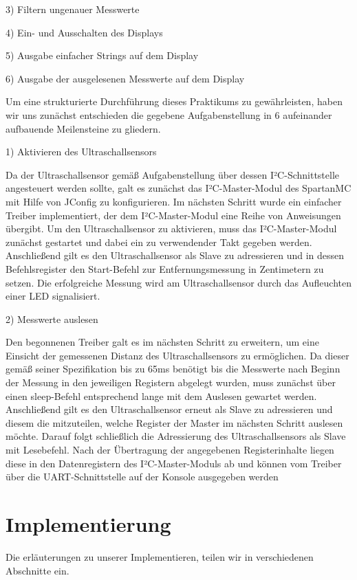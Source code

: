 \documentclass[parskip,
							 oneside,
							 11pt,
							 noheadingspace,
							 accentcolor=tud1d,
							 bigchapter,
							 colorback]{tudreport}
\begin{document}
3) Filtern ungenauer Messwerte

4) Ein- und Ausschalten des Displays

5) Ausgabe einfacher Strings auf dem Display

6) Ausgabe der ausgelesenen Messwerte auf dem Display

Um eine strukturierte Durchführung dieses Praktikums zu gewährleisten, haben wir uns zunächst entschieden die gegebene Aufgabenstellung in 6 aufeinander aufbauende Meilensteine zu gliedern.

1) Aktivieren des Ultraschallsensors

Da der Ultraschallsensor gemäß Aufgabenstellung über dessen I²C-Schnittstelle angesteuert werden sollte, galt es zunächst das I²C-Master-Modul des SpartanMC mit Hilfe von JConfig zu konfigurieren. Im nächsten Schritt wurde ein einfacher Treiber implementiert, der dem I²C-Master-Modul eine Reihe von Anweisungen übergibt. Um den Ultraschallsensor zu aktivieren, muss das I²C-Master-Modul zunächst gestartet und dabei ein zu verwendender Takt gegeben werden. Anschließend gilt es den Ultraschallsensor als Slave zu adressieren und in dessen Befehlsregister den Start-Befehl zur Entfernungsmessung in Zentimetern zu setzen. Die erfolgreiche Messung wird am Ultraschallsensor durch das Aufleuchten einer LED signalisiert.

2) Messwerte auslesen

Den begonnenen Treiber galt es im nächsten Schritt zu erweitern, um eine Einsicht der gemessenen Distanz des Ultraschallsensors zu ermöglichen. Da dieser gemäß seiner Spezifikation bis zu 65ms benötigt bis die Messwerte nach Beginn der Messung in den jeweiligen Registern abgelegt wurden, muss zunächst über einen sleep-Befehl entsprechend lange mit dem Auslesen gewartet werden. Anschließend gilt es den Ultraschallsensor erneut als Slave zu adressieren und diesem die mitzuteilen, welche Register der Master im nächsten Schritt auslesen möchte. Darauf folgt schließlich die Adressierung des Ultraschallsensors als Slave mit Lesebefehl. Nach der Übertragung der angegebenen Registerinhalte liegen diese in den Datenregistern des I²C-Master-Moduls ab und können vom Treiber über die UART-Schnittstelle auf der Konsole ausgegeben werden


\chapter{Implementierung}
Die erläuterungen zu unserer Implementieren, teilen wir in verschiedenen Abschnitte ein.
\end{document}
